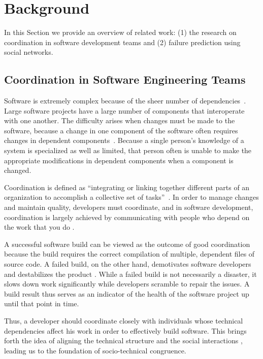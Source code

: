 \section{Background}
\label{chap:bg}
In this Section we provide an overview of related work: (1) the research on coordination in software development teams and (2) failure prediction using social networks.

\subsection{Coordination in Software Engineering Teams}
Software is extremely complex because of the sheer number of dependencies~\cite{sawyer2004:teams}.
Large software projects have a large number of components that interoperate with one another.
The difficulty arises when changes must be made to the software, because a change in one component of the software often requires changes in dependent components~\cite{desouza:2008}. Because a single person's knowledge of a system is specialized as well as limited, that person often is unable to make the appropriate modifications in dependent components when a component is changed.

Coordination is defined as ``integrating or linking together different parts of an organization to accomplish a collective set of tasks''~\cite{vandeven1976}. In order to manage changes and maintain quality, developers must coordinate, and in software development, coordination is largely achieved by communicating with people who depend on the work that you do \cite{kraut:1995coordination}.

A successful software build can be viewed as the outcome of good coordination because the build requires the correct compilation of multiple, dependent files of source code.
A failed build, on the other hand, demotivates software developers \cite{holck2004,damian:icgse:2007} and destabilizes the product \cite{cusumano1997}.
While a failed build is not necessarily a disaster, it slows down work significantly while developers scramble to repair the issues.
A build result thus serves as an indicator of the health of the software project up until that point in time.

Thus, a developer should coordinate closely with individuals whose technical dependencies affect his work in order to effectively build software. This brings forth the idea of aligning the technical structure and the social interactions \cite{herbsleb2007:fose}, leading us to the foundation of socio-technical congruence.

